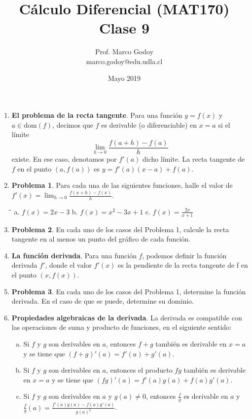 \documentclass[10pt]{article}
\title{C\'alculo Diferencial (MAT170)\\ Clase 9 }
\author{Prof. Marco Godoy\\
marco.godoy@edu.udla.cl}
\date{Mayo 2019}
\newcommand{\2}[1]{\hspace{-0.93cm}\colorbox{color1}{\hspace{0.07cm} \parbox{17cm}{\vspace{0.2cm} #1}\hspace*{0.07cm} }}
\newcommand{\3}[1]{\hspace{-0.93cm}\colorbox{color7}{\hspace{0.07cm} \parbox{17cm}{\vspace{0.2cm} #1}\hspace*{0.07cm} }}
\theoremstyle{theorem}
\numberwithin{equation}{section}
\newcommand{\dis}{\displaystyle}
\begin{document}
\maketitle


\begin{enumerate}[1.]
    \item \textbf{El problema de la recta tangente}. Para una funci\'on $y=f(x)$ y $a\in \mathrm{dom}(f)$, decimos que $f$ es derivable (o diferenciable) en $x=a$ si el l\'imite \begin{equation}
    \lim_{h\to 0}\frac{f(a+h)-f(a)}{h}
    \end{equation}
 existe. En ese caso, denotamos por $f'(a)$ dicho l\'imite. La recta tangente de $f$ en el punto $(a,f(a))$ es $y=f'(a)(x-a)+f(a)$. 
    \item[] \textbf{Problema 1}. Para cada una de las siguientes funciones, halle el valor de $\dis f'(x)=\lim_{h\to 0}\frac{f(x+h)-f(x)}{h}$.
  \begin{tabbing}
\hspace{5 cm}\=\hspace{5 cm}\=\kill
 a.  $f(x)=2x-3$ \>  b.  $f(x)=x^2-3x+1$ \> c.  $\dis f(x)=\frac{2x}{x+1}$\\   
\end{tabbing}
    \item[] \textbf{Problema 2}. En cada uno de los casos del Problema 1, calcule la recta tangente en al menos un punto del gr\'afico de cada funci\'on.
    \item \textbf{La funci\'on derivada}. Para una funci\'on $f$, podemos definir la funci\'on derivada $f'$, donde el valor $f'(x)$ es la pendiente de la recta tangente de f en el punto $(x,f(x))$. 
    \item[] \textbf{Problema 3}. En cada uno de los casos del Problema 1, determine la funci\'on derivada. En el caso de que se puede, determine su dominio.
    \item \textbf{Propiedades algebraicas de la derivada}. La derivada es compatible con las operaciones de suma y producto de funciones, en el siguiente sentido:
    \begin{enumerate}[a.]
        \item Si $f$ y $g$ son derivables en $a$, entonces $f+g$ tambi\'en es derivable en $x=a$ y se tiene que $(f+g)'(a)=f'(a)+g'(a)$.
        \item Si $f$ y $g$ son derivables en $a$, entonces el producto $fg$ tambi\'en es derivable en $x=a$ y se tiene que $(fg)'(a)=f'(a)g(a)+f(a)g'(a)$.
        \item Si $f$ y $g$ son derivables en $a$ y $g(a)\neq 0$, entonces $\displaystyle \frac{f}{g}$ es derivable en $a$ y $\displaystyle \frac{f}{g}(a)=\frac{f'(a)g(a)-f(a)g'(a)}{g(a)^2}$.

\end{enumerate}
\end{enumerate}
\end{document}
